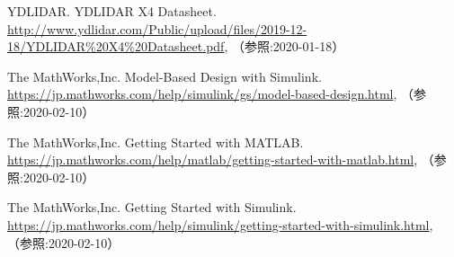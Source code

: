 {\begin{thebibliography}{9}
   YDLIDAR. YDLIDAR X4 Datasheet. \url{http://www.ydlidar.com/Public/upload/files/2019-12-18/YDLIDAR%20X4%20Datasheet.pdf}, （参照:2020-01-18）

   The MathWorks,Inc. Model-Based Design with Simulink. \url{https://jp.mathworks.com/help/simulink/gs/model-based-design.html}, （参照:2020-02-10）

   The MathWorks,Inc. Getting Started with MATLAB. \url{https://jp.mathworks.com/help/matlab/getting-started-with-matlab.html}, （参照:2020-02-10）

   The MathWorks,Inc. Getting Started with Simulink. \url{https://jp.mathworks.com/help/simulink/getting-started-with-simulink.html}, （参照:2020-02-10）

\end{thebibliography}
}